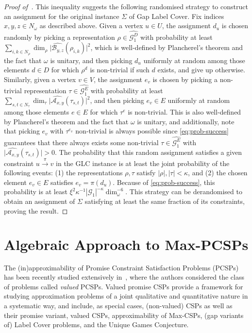 \documentclass[a4paper,11pt]{article}
\theoremstyle{definition}
\newcommand{\gr}{\mathscr{G}}
\newcommand{\A}{\mathcal{A}}
\newcommand{\B}{\mathcal{B}}
\begin{document}
\begin{proof}[Proof of~]
This inequality suggests the following randomised strategy to construct an assignment for the original instance $\Sigma$ of Gap Label Cover. Fix indices $x,y,z \in N_\omega$ as described above. Given a vertex $u\in U$, the assignment $d_u$ is chosen randomly by picking a representation $\rho \in \widehat{\gr_1^D}$ 
with probability at least
$\sum_{i,k\in N_\rho} \dim_\rho \vert\widehat{{\B}_{y,z}}(\rho_{i,k} )\vert^2$, which is well-defined by Plancherel's theorem and the fact that $\omega$ is unitary, and then picking $d_u$ uniformly at random among those elements $d\in D$ for which $\rho^d$ is non-trivial if such $d$ exists, and give up otherwise. Similarly, given a vertex $v\in V$, the assignment $e_v$ is chosen by picking a 
non-trivial representation $\tau  \in \widehat{\gr_1^E}$ 
with probability at least
$\sum_{s,t\in N_\tau} \dim_\tau \vert\widehat{\A_{x,y}}(\tau_{s,t})\vert^2$, and then picking $e_v\in E$ uniformly at random among those elements $e\in E$ for which $\tau^e$ is non-trivial. This is also well-defined by Plancherel's theorem and the fact that $\omega$ is unitary, and additionally, note that picking $e_v$ with $\tau^{e_v}$ non-trivial is always possible since \eqref{eq:prob-success} guarantees that there always exists some non-trivial $\tau \in \widehat{\gr_1^E}$ with $\vert\widehat{\A_{x,y}}(\tau_{s,t})\vert>0$. The probability that this random assignment satisfies a given constraint $u \xrightarrow{\pi} v$ in the GLC instance is at least
the joint probability of the following events: (1) the representations $\rho, \tau$ satisfy  $|\rho|, |\tau| < \kappa$,
and
(2) the chosen element $e_v\in E$ satisfies $e_v = \pi(d_u)$.
Because of \eqref{eq:prob-success}, this probability is at least
$\xi^2\kappa^{-1}|\gr_1|^{-\kappa}\dim_\omega^{-6}$. This strategy can be
derandomised to obtain an assignment of $\Sigma$ satisfying at least the same fraction of its constraints, proving the result. 
\end{proof}

\section{Algebraic Approach to Max-PCSPs} \label{sec:algebraic-approach}

The (in)approximability of Promise Constraint Satisfaction Problems (PCSPs) has
been recently studied extensively in~\cite{Barto24:lics}, where the authors
considered the class of problems called \emph{valued} PCSPs. 
Valued promise CSPs provide a framework for studying approximation problems of a joint
qualitative and quantitative nature in a systematic way, and include, as special
cases, (non-valued) CSPs as well as their promise variant,
valued CSPs, approximability of Max-CSPs, (gap variants of) Label Cover problems, and the Unique Games Conjecture. 
\end{document}
